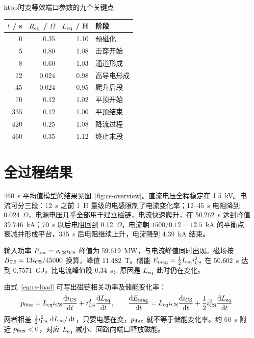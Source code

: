 \begin{dtable}{htbp}{时变等效端口参数的九个关键点}
\label{tab:cs-points}
\begin{tabularx}{0.72\linewidth}{RRRL}
\toprule
\headrow $t$ / s & $R_{\mathrm{eq}}$ / $\Omega$ & $L_{\mathrm{eq}}$ / H & 阶段 \\
   & 0.35  & 1.10 & 预磁化 \\
5   & 0.80  & 1.08 & 击穿开始 \\
8   & 0.60  & 1.03 & 通道形成 \\
12  & 0.024 & 0.98 & 高导电形成 \\
45  & 0.024 & 0.95 & 爬升后段 \\
70  & 0.12  & 1.02 & 平顶开始 \\
335 & 0.12  & 1.00 & 平顶结束 \\
420 & 0.25  & 1.08 & 降流过程 \\
460 & 0.35  & 1.12 & 终止末段 \\
\bottomrule
\end{tabularx}
\end{dtable}

\section{全过程结果}

460~s 平均值模型的结果见图~\ref{fig:cs-overview}。直流电压全程稳定在 1.5~kV。电流可分三段：12~s 之前 1~H 量级的电感限制了电流变化率；12--45~s 电阻降到 0.024~$\Omega$，电源电压几乎全部用于建立磁链，电流快速爬升，在 50.262~s 达到峰值 39.746~kA；70~s 以后电阻回到 0.12~$\Omega$，电流朝 $1500/0.12=12.5$~kA 的平衡点衰减并形成平台，335~s 后电阻继续上升，电流降到 4.39~kA 结束。


输入功率 $P_{\mathrm{abs}}=v_{\mathrm{CS}}i_{\mathrm{CS}}$ 峰值为 59.619~MW，与电流峰值同时出现。磁场按 $B_{\mathrm{CS}}=13i_{\mathrm{CS}}/45000$ 换算，峰值 11.482~T。储能 $E_{\mathrm{mag}}=\tfrac12L_{\mathrm{eq}}i_{\mathrm{CS}}^2$ 在 50.602~s 达到 0.7571~GJ，比电流峰值晚 0.34~s，原因是 $L_{\mathrm{eq}}$ 此时仍在变化。

由式~\eqref{eq:cs-load} 可写出磁链相关功率及储能变化率：
\begin{equation}
p\sub{flux}=L\sub{eq}i\sub{CS}\frac{\dd i\sub{CS}}{\dd t}+i\sub{CS}^2\frac{\dd L\sub{eq}}{\dd t},\qquad
\frac{\dd E\sub{mag}}{\dd t}=L\sub{eq}i\sub{CS}\frac{\dd i\sub{CS}}{\dd t}+\frac12i\sub{CS}^2\frac{\dd L\sub{eq}}{\dd t}.
\end{equation}
两者相差 $\tfrac12i_{\mathrm{CS}}^2\,\mathop{}\!\mathrm{d} L_{\mathrm{eq}}/\mathop{}\!\mathrm{d} t$，只要电感在变，$p_{\mathrm{flux}}$ 就不等于储能变化率。约 60~s 附近 $p_{\mathrm{flux}}<0$，对应 $L_{\mathrm{eq}}$ 减小、回路向端口释放磁能。

